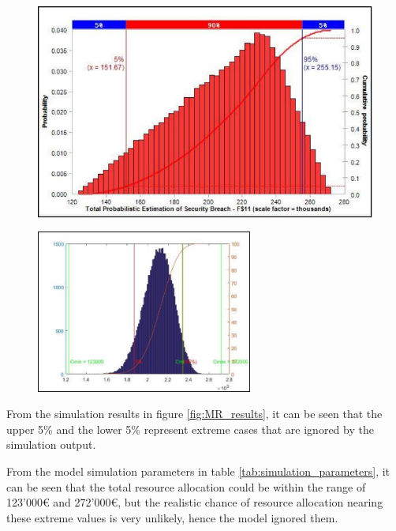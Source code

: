 \begin{figure}[H]
\begin{minipage}{.5\textwidth}
  \centering
  \includegraphics[width=1\linewidth]{Resources/ModelRisk_results.png}
    \label{fig:MR_results}
\end{minipage}%
\begin{minipage}{.5\textwidth}
  \centering
  \includegraphics[width=1\linewidth, height=5.35cm]{Resources/MATLAB_results.png}
    \label{fig:ML_results}
\end{minipage}
\end{figure}

From the simulation results in figure \ref{fig:MR_results}, it can be seen that the upper 5\% and the lower 5\% represent extreme cases that are ignored by the simulation output.

From the model simulation parameters in table \ref{tab:simulation_parameters}, it can be seen that the total resource allocation could be within the range of 123'000€ and 272'000€, but the realistic chance of resource allocation nearing these extreme values is very unlikely, hence the model ignored them.

